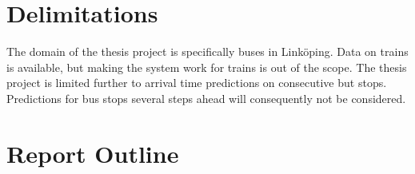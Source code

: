 

\section{Delimitations}\label{sec:delimitations}
The domain of the thesis project is specifically buses in
Linköping. Data on trains is available, but making the system
work for trains is out of the scope. The thesis project is limited further
to arrival time predictions on consecutive
but stops. Predictions for bus stops several steps ahead will
consequently not be considered.



\section{Report Outline}
